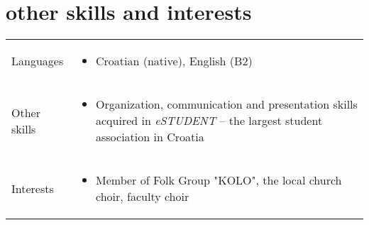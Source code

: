 \documentclass[a4paper]{article}
\makeatletter
\newlength{\tablewidth}
\newenvironment{skills}{%
\setlength{\tablewidth}{\linewidth}
\addtolength{\tablewidth}{-2\tabcolsep}
\begin{tabular}{@{}p{0.1\tablewidth}p{0.9\tablewidth}@{}}
}{%
\end{tabular}
}
\makeatother
\begin{document}
\section{other skills and interests}
\begin{skills}
	Languages & 
	\begin{itemize}
		\item
			Croatian (native), English (B2) 
	\end{itemize} \\
	Other skills &
	\begin{itemize}
    	\item 
    		Organization, communication and presentation skills acquired in \textit{eSTUDENT} -- the largest student association in Croatia 
    \end{itemize} \\
    Interests &
    \begin{itemize}
    	\item 
    		Member of Folk Group "KOLO", the local church choir, faculty choir
    \end{itemize} \\
\end{skills}
\end{document}
